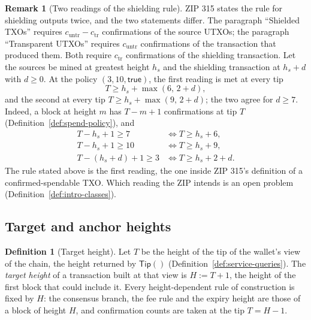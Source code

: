 \documentclass[11pt,a4paper]{article}
\theoremstyle{definition}
\newtheorem{definition}[theorem]{Definition}
\newtheorem{remark}[theorem]{Remark}
\begin{document}
\begin{remark}[Two readings of the shielding rule]
\label{rem:spend-shielding-readings}
ZIP 315 states the rule for shielding outputs twice, and the two statements
differ. The paragraph ``Shielded TXOs'' requires $c_{\mathrm{untr}} -
c_{\mathrm{tr}}$ confirmations of the source UTXOs; the paragraph
``Transparent UTXOs'' requires $c_{\mathrm{untr}}$ confirmations of the
transaction that produced them. Both require $c_{\mathrm{tr}}$ confirmations
of the shielding transaction. Let the sources be mined at greatest height
$h_s$ and the shielding transaction at $h_s + d$ with $d \ge 0$. At the
policy $(3, 10, \mathsf{true})$, the first reading is met at every tip
\[
  T \ge h_s + \max(6,\, 2 + d),
\]
and the second at every tip $T \ge h_s + \max(9,\, 2 + d)$; the two agree
for $d \ge 7$. Indeed, a block at height $m$ has $T - m + 1$ confirmations
at tip $T$ (Definition~\ref{def:spend-policy}), and
\begin{align*}
  T - h_s + 1 \ge 7 &\iff T \ge h_s + 6, \\
  T - h_s + 1 \ge 10 &\iff T \ge h_s + 9, \\
  T - (h_s + d) + 1 \ge 3 &\iff T \ge h_s + 2 + d.
\end{align*}
The rule stated above is the first reading, the one inside ZIP 315's
definition of a confirmed-spendable TXO. Which reading the ZIP intends is
an open problem (Definition~\ref{def:intro-classes}).
\end{remark}

\subsection{Target and anchor heights}\label{sec:spend-heights}

\begin{definition}[Target height]\label{def:spend-target}
Let $T$ be the height of the tip of the wallet's view of the chain, the
height returned by $\mathsf{Tip}()$ (Definition~\ref{def:service-queries}).
The \emph{target height} of a transaction built at that view is $H := T +
1$, the height of the first block that could include it. Every
height-dependent rule of construction is fixed by $H$: the consensus
branch, the fee rule and the expiry height are those of a block of height
$H$, and confirmation counts are taken at the tip $T = H - 1$.
\end{definition}
\end{document}

